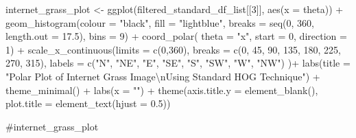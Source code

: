 \documentclass[
  letterpaper,
  DIV=11,
  numbers=noendperiod]{scrreprt}
\newenvironment{Shaded}{\begin{snugshade}}{\end{snugshade}}
\newcommand{\AttributeTok}[1]{\textcolor[rgb]{0.40,0.45,0.13}{#1}}
\newcommand{\CommentTok}[1]{\textcolor[rgb]{0.37,0.37,0.37}{#1}}
\newcommand{\DecValTok}[1]{\textcolor[rgb]{0.68,0.00,0.00}{#1}}
\newcommand{\FloatTok}[1]{\textcolor[rgb]{0.68,0.00,0.00}{#1}}
\newcommand{\FunctionTok}[1]{\textcolor[rgb]{0.28,0.35,0.67}{#1}}
\newcommand{\NormalTok}[1]{\textcolor[rgb]{0.00,0.23,0.31}{#1}}
\newcommand{\OtherTok}[1]{\textcolor[rgb]{0.00,0.23,0.31}{#1}}
\newcommand{\SpecialCharTok}[1]{\textcolor[rgb]{0.37,0.37,0.37}{#1}}
\newcommand{\StringTok}[1]{\textcolor[rgb]{0.13,0.47,0.30}{#1}}
\begin{document}
\begin{Shaded}
\begin{Highlighting}[]
\NormalTok{internet\_grass\_plot }\OtherTok{\textless{}{-}}
  \FunctionTok{ggplot}\NormalTok{(filtered\_standard\_df\_list[[}\DecValTok{3}\NormalTok{]], }
         \FunctionTok{aes}\NormalTok{(}\AttributeTok{x =}\NormalTok{ theta)) }\SpecialCharTok{+}
  \FunctionTok{geom\_histogram}\NormalTok{(}\AttributeTok{colour =} \StringTok{"black"}\NormalTok{, }
                 \AttributeTok{fill =} \StringTok{"lightblue"}\NormalTok{, }
                 \AttributeTok{breaks =} \FunctionTok{seq}\NormalTok{(}\DecValTok{0}\NormalTok{, }\DecValTok{360}\NormalTok{, }\AttributeTok{length.out =} \FloatTok{17.5}\NormalTok{),}
                 \AttributeTok{bins =} \DecValTok{9}\NormalTok{) }\SpecialCharTok{+}
  \FunctionTok{coord\_polar}\NormalTok{(}
    \AttributeTok{theta =} \StringTok{"x"}\NormalTok{, }\AttributeTok{start =} \DecValTok{0}\NormalTok{, }\AttributeTok{direction =} \DecValTok{1}\NormalTok{) }\SpecialCharTok{+}
  \FunctionTok{scale\_x\_continuous}\NormalTok{(}\AttributeTok{limits =} \FunctionTok{c}\NormalTok{(}\DecValTok{0}\NormalTok{,}\DecValTok{360}\NormalTok{),}
    \AttributeTok{breaks =} \FunctionTok{c}\NormalTok{(}\DecValTok{0}\NormalTok{, }\DecValTok{45}\NormalTok{, }\DecValTok{90}\NormalTok{, }\DecValTok{135}\NormalTok{, }\DecValTok{180}\NormalTok{, }\DecValTok{225}\NormalTok{, }\DecValTok{270}\NormalTok{, }\DecValTok{315}\NormalTok{), }
    \AttributeTok{labels =} \FunctionTok{c}\NormalTok{(}\StringTok{"N"}\NormalTok{, }\StringTok{"NE"}\NormalTok{, }\StringTok{"E"}\NormalTok{, }\StringTok{"SE"}\NormalTok{, }\StringTok{"S"}\NormalTok{, }\StringTok{"SW"}\NormalTok{, }\StringTok{"W"}\NormalTok{, }\StringTok{"NW"}\NormalTok{)}
\NormalTok{  )}\SpecialCharTok{+}
  \FunctionTok{labs}\NormalTok{(}\AttributeTok{title =} \StringTok{"Polar Plot of Internet Grass Image}\SpecialCharTok{\textbackslash{}n}\StringTok{Using Standard HOG Technique"}\NormalTok{) }\SpecialCharTok{+}
  \FunctionTok{theme\_minimal}\NormalTok{() }\SpecialCharTok{+}
  \FunctionTok{labs}\NormalTok{(}\AttributeTok{x =} \StringTok{""}\NormalTok{) }\SpecialCharTok{+}
  \FunctionTok{theme}\NormalTok{(}\AttributeTok{axis.title.y =} \FunctionTok{element\_blank}\NormalTok{(),}
        \AttributeTok{plot.title =} \FunctionTok{element\_text}\NormalTok{(}\AttributeTok{hjust =} \FloatTok{0.5}\NormalTok{))}

\CommentTok{\#internet\_grass\_plot}
\end{Highlighting}
\end{Shaded}
\end{document}

